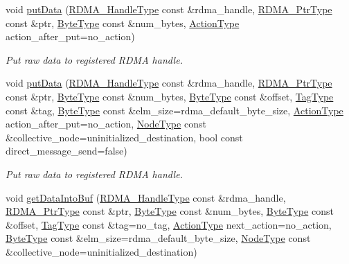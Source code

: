\begin{DoxyCompactItemize}
void \hyperlink{structvt_1_1rdma_1_1_r_d_m_a_manager_a651ca7aaa9fdbf404c41157b883407e2}{put\+Data} (\hyperlink{namespacevt_a10442579ec4e7ebef223818e64bcf908}{R\+D\+M\+A\+\_\+\+Handle\+Type} const \&rdma\+\_\+handle, \hyperlink{namespacevt_aab05b4a584f7ee835a6d0f66915cf59b}{R\+D\+M\+A\+\_\+\+Ptr\+Type} const \&ptr, \hyperlink{namespacevt_aab8d55968084610ce3b17057981e9300}{Byte\+Type} const \&num\+\_\+bytes, \hyperlink{namespacevt_ae0a5a7b18cc99d7b732cb4d44f46b0f3}{Action\+Type} action\+\_\+after\+\_\+put=no\+\_\+action)
\begin{DoxyCompactList}\small\item\em Put raw data to registered R\+D\+MA handle. \end{DoxyCompactList}\item 
void \hyperlink{structvt_1_1rdma_1_1_r_d_m_a_manager_a839c0031a48c5341494b119b0f10bafa}{put\+Data} (\hyperlink{namespacevt_a10442579ec4e7ebef223818e64bcf908}{R\+D\+M\+A\+\_\+\+Handle\+Type} const \&rdma\+\_\+handle, \hyperlink{namespacevt_aab05b4a584f7ee835a6d0f66915cf59b}{R\+D\+M\+A\+\_\+\+Ptr\+Type} const \&ptr, \hyperlink{namespacevt_aab8d55968084610ce3b17057981e9300}{Byte\+Type} const \&num\+\_\+bytes, \hyperlink{namespacevt_aab8d55968084610ce3b17057981e9300}{Byte\+Type} const \&offset, \hyperlink{namespacevt_a84ab281dae04a52a4b243d6bf62d0e52}{Tag\+Type} const \&tag, \hyperlink{namespacevt_aab8d55968084610ce3b17057981e9300}{Byte\+Type} const \&elm\+\_\+size=rdma\+\_\+default\+\_\+byte\+\_\+size, \hyperlink{namespacevt_ae0a5a7b18cc99d7b732cb4d44f46b0f3}{Action\+Type} action\+\_\+after\+\_\+put=no\+\_\+action, \hyperlink{namespacevt_a866da9d0efc19c0a1ce79e9e492f47e2}{Node\+Type} const \&collective\+\_\+node=uninitialized\+\_\+destination, bool const direct\+\_\+message\+\_\+send=false)
\begin{DoxyCompactList}\small\item\em Put raw data to registered R\+D\+MA handle. \end{DoxyCompactList}\item 
void \hyperlink{structvt_1_1rdma_1_1_r_d_m_a_manager_aa97aeb2fee7d1a1b2228ff063d64eb5f}{get\+Data\+Into\+Buf} (\hyperlink{namespacevt_a10442579ec4e7ebef223818e64bcf908}{R\+D\+M\+A\+\_\+\+Handle\+Type} const \&rdma\+\_\+handle, \hyperlink{namespacevt_aab05b4a584f7ee835a6d0f66915cf59b}{R\+D\+M\+A\+\_\+\+Ptr\+Type} const \&ptr, \hyperlink{namespacevt_aab8d55968084610ce3b17057981e9300}{Byte\+Type} const \&num\+\_\+bytes, \hyperlink{namespacevt_aab8d55968084610ce3b17057981e9300}{Byte\+Type} const \&offset, \hyperlink{namespacevt_a84ab281dae04a52a4b243d6bf62d0e52}{Tag\+Type} const \&tag=no\+\_\+tag, \hyperlink{namespacevt_ae0a5a7b18cc99d7b732cb4d44f46b0f3}{Action\+Type} next\+\_\+action=no\+\_\+action, \hyperlink{namespacevt_aab8d55968084610ce3b17057981e9300}{Byte\+Type} const \&elm\+\_\+size=rdma\+\_\+default\+\_\+byte\+\_\+size, \hyperlink{namespacevt_a866da9d0efc19c0a1ce79e9e492f47e2}{Node\+Type} const \&collective\+\_\+node=uninitialized\+\_\+destination)

\end{DoxyCompactItemize}
